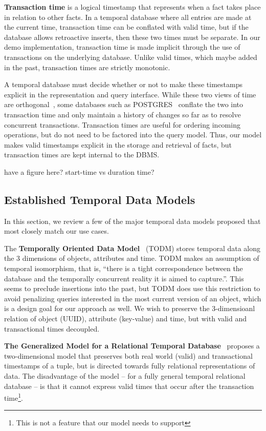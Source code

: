 \textbf{Transaction time} is a logical timestamp that represents when a fact
takes place in relation to other facts. In a temporal database where all
entries are made at the current time, transaction time can be conflated with
valid time, but if the database allows retroactive inserts, then these two
times must be separate. In our demo implementation, transaction time is made
implicit through the use of transactions on the underlying database. Unlike
valid times, which maybe added in the past, transaction times are strictly
monotonic.

A temporal database must decide whether or not to make these timestamps
explicit in the representation and query interface.  While these two views of
time are orthogonal~\cite{snodgrass1986temporal}, some databases such as
POSTGRES~\cite{stonebraker1990implementation} conflate the two into transaction
time and only maintain a history of changes so far as to resolve concurrent
transactions. Transaction times are useful for ordering incoming operations,
but do not need to be factored into the query model. Thus, our model makes
valid timestamps explicit in the storage and retrieval of facts, but
transaction times are kept internal to the DBMS.

have a figure here? start-time vs duration time?
\fi

\subsection{Established Temporal Data Models}

In this section, we review a few of the major temporal data models proposed that
most closely match our use cases.

The \textbf{Temporally Oriented Data Model}~\cite{ariav1986temporally} (TODM)
stores temporal data along the 3 dimensions of objects, attributes and
time. TODM makes an assumption of temporal isomorphism, that is, ``there is a tight
correspondence between the database and the temporally concurrent reality it is
aimed to capture.''\cite{ariav1986temporally}. This seems to preclude
insertions into the past, but TODM does use this restriction to avoid
penalizing queries interested in the most current version of an object, which
is a design goal for our approach as well. We wish to preserve the 3-dimensioanl
relation of object (UUID), attribute (key-value) and time, but with valid
and transactional times decoupled.

\textbf{The Generalized Model for a Relational Temporal Database}~\cite{gadia1988generalized} proposes a two-dimensional
model that preserves both real world (valid) and transactional timestamps of a
tuple, but is directed towards fully relational representations of data.  The
disadvantage of the model -- for a fully general temporal relational database
-- is that it cannot express valid times that occur after the transaction
time\footnote{This is not a feature that our model needs to support}.

